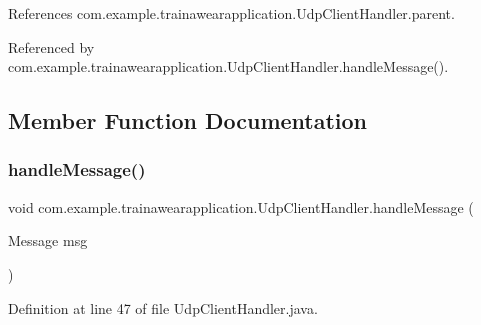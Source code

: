 References com.\+example.\+trainawearapplication.\+Udp\+Client\+Handler.\+parent.



Referenced by com.\+example.\+trainawearapplication.\+Udp\+Client\+Handler.\+handle\+Message().



\subsection{Member Function Documentation}
\mbox{\label{classcom_1_1example_1_1trainawearapplication_1_1_udp_client_handler_a433f624fad2243aaed2e97f7f3cb8434}} 
\subsubsection{\texorpdfstring{handleMessage()}{handleMessage()}}
{\footnotesize\ttfamily void com.\+example.\+trainawearapplication.\+Udp\+Client\+Handler.\+handle\+Message (\begin{DoxyParamCaption}\item[{Message}]{msg }\end{DoxyParamCaption})}



Definition at line 47 of file Udp\+Client\+Handler.\+java.


